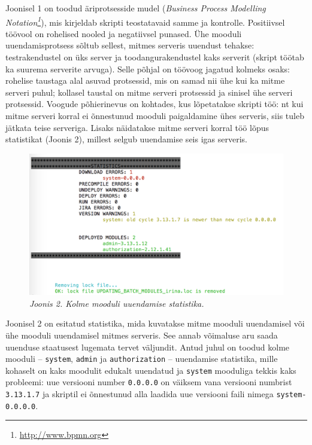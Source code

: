\documentclass[12pt]{article}
\newcommand{\code}[1]{\texttt{#1}}
\begin{document}
   \newpage
   
   Joonisel 1 on toodud äriprotsesside mudel (\textit{Business Process Modelling Notation\footnote{\url{http://www.bpmn.org}}}), mis kirjeldab skripti teostatavaid samme ja kontrolle. Positiivsel töövool on rohelised nooled ja negatiivsel punased. Ühe mooduli uuendamisprotsess sõltub sellest, mitmes serveris uuendust tehakse: testrakendustel on üks server ja toodangurakendustel kaks serverit (skript töötab ka suurema serverite arvuga). Selle põhjal on töövoog jagatud kolmeks osaks: rohelise taustaga alal asuvad protsessid, mis on samad nii ühe kui ka mitme serveri puhul; kollasel taustal on mitme serveri protsessid ja sinisel ühe serveri protsessid. Voogude põhierinevus on kohtades, kus lõpetatakse skripti töö: nt kui mitme serveri korral ei õnnestunud mooduli paigaldamine ühes serveris, siis tuleb jätkata teise serveriga. Lisaks näidatakse mitme serveri korral töö lõpus statistikat (Joonis 2), millest selgub uuendamise seis igas serveris.
   
   \begin{figure}[H]
     \begin{center}
       \includegraphics[width=\textwidth]{screenshots/statistics.png}
       \caption*{\textit{Joonis 2. Kolme mooduli uuendamise statistika.}}
     \end{center}
   \end{figure}
   
   Joonisel 2 on esitatud statistika, mida kuvatakse mitme mooduli uuendamisel või ühe mooduli uuendamisel mitmes serveris. See annab võimaluse aru saada uuenduse staatusest lugemata tervet väljundit. Antud juhul on toodud kolme mooduli \--- \code{system}, \code{admin} ja \code{authorization} \--- uuendamise statistika, mille kohaselt on  kaks moodulit edukalt uuendatud ja \code{system} mooduliga tekkis kaks probleemi: uue versiooni number \code{0.0.0.0} on väiksem vana versiooni numbrist \code{3.13.1.7} ja skriptil ei õnnestunud alla laadida uue versiooni faili nimega \code{system-0.0.0.0}. 
   
\end{document}
